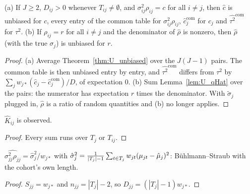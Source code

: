 \begin{theorem}\label{thm:U_pooled}
  \leanok
  (a) If $J \ge 2$, $D_{ij} > 0$ whenever $T_{ij} \ne \emptyset$, and
  $\sigma^2_{ij}\rho_{ij} = c$ for all $i \ne j$, then $\hat c$ is unbiased for $c$, every
  entry of the common table for $\sigma^2_{ij}\rho_{ij}$, $\hat c_j^{\mathrm{com}}$ for $c_j$ and
  $\widehat{\tau^2}^{\mathrm{com}}$ for $\tau^2$.
  (b) If $\rho_{ij} = r$ for all $i \ne j$ and the denominator of $\hat\rho$ is nonzero, then
  $\hat\rho$ (with the true $\sigma_j$) is unbiased for $r$.
\end{theorem}
\begin{proof}
  \leanok
  (a) Average Theorem~\ref{thm:U_unbiased} over the $J(J-1)$ pairs. The common table is then
  unbiased entry by entry, and $\widehat{\tau^2}^{\mathrm{com}}$ differs from $\widehat{\tau^2}$
  by $\sum_j w_{j*}(\hat c_j - \hat c_j^{\mathrm{com}})/D$, of expectation $0$. (b) Sum
  Lemma~\ref{lem:U_qHat} over the pairs: the numerator has expectation $r$ times the
  denominator. With $\tilde\sigma_j$ plugged in, $\hat\rho$ is a ratio of random
  quantities and (b) no longer applies.
\end{proof}

\begin{lemma}\label{lem:U_observed}
  \leanok
  $\hat K_{ij}$ is observed.
\end{lemma}
\begin{proof}
  \leanok
  Every sum runs over $T_j$ or $T_{ij}$.
\end{proof}

\begin{theorem}[Diagonal]\label{thm:U_sigRhoHat_self}
  \leanok
  $\widehat{\sigma^2_{jj}\rho_{jj}} = \hat\sigma_j^2/w_{j*}$ with
  $\hat\sigma_j^2 = \frac{1}{|T_j|-1}\sum_{t\in T_j} w_{jt}(\mu_{jt}-\hat\mu_j)^2$:
  Bühlmann--Straub with the cohort's own length.
\end{theorem}
\begin{proof}
  \leanok
  $S_{jj} = w_{j*}$ and $n_{jj} = |T_j| - 2$, so $D_{jj} = (|T_j| - 1)w_{j*}$.
\end{proof}

